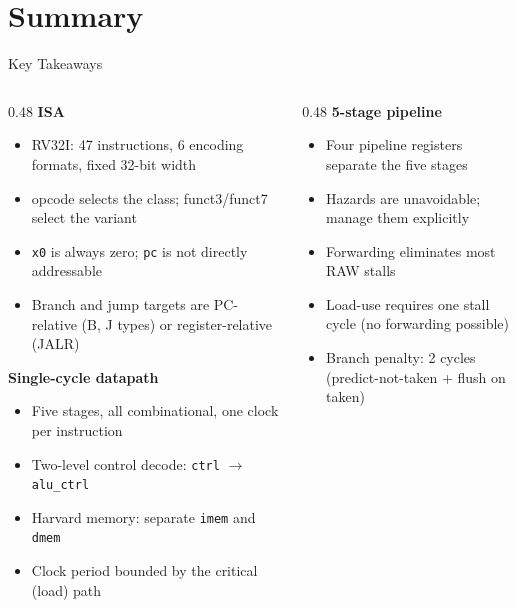 \documentclass[aspectratio=169,10pt]{beamer}
\begin{document}
\section{Summary}

\begin{frame}{Key Takeaways}
  \begin{columns}[T]
    \begin{column}{0.48\textwidth}
      \textbf{ISA}
      \begin{itemize}
        \item RV32I: 47 instructions, 6 encoding formats, fixed 32-bit width
        \item opcode selects the class; funct3/funct7 select the variant
        \item \texttt{x0} is always zero; \texttt{pc} is not directly addressable
        \item Branch and jump targets are PC-relative (B, J types) or register-relative (JALR)
      \end{itemize}

      \vspace{0.6em}
      \textbf{Single-cycle datapath}
      \begin{itemize}
        \item Five stages, all combinational, one clock per instruction
        \item Two-level control decode: \texttt{ctrl} $\to$ \texttt{alu\_ctrl}
        \item Harvard memory: separate \texttt{imem} and \texttt{dmem}
        \item Clock period bounded by the critical (load) path
      \end{itemize}
    \end{column}
    \begin{column}{0.48\textwidth}
      \textbf{5-stage pipeline}
      \begin{itemize}
        \item Four pipeline registers separate the five stages
        \item Hazards are unavoidable; manage them explicitly
        \item Forwarding eliminates most RAW stalls
        \item Load-use requires one stall cycle (no forwarding possible)
        \item Branch penalty: 2 cycles (predict-not-taken + flush on taken)
      \end{itemize}


\end{column}
\end{columns}
\end{frame}
\end{document}
